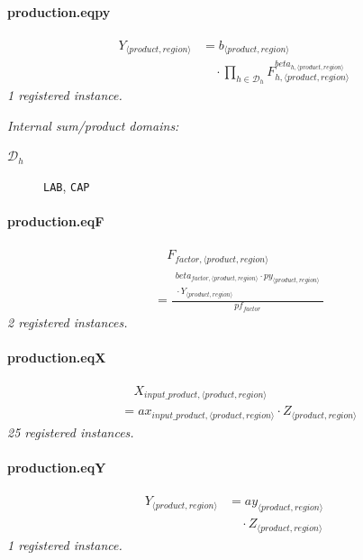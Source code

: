 \documentclass[11pt]{article}
\begin{document}
\paragraph{production.eqpy}
\begin{align*}
Y_{\langle product, region\rangle} &= b_{\langle product, region\rangle}\\
&\quad {}\cdot \prod_{h \in \mathcal{D}_{h}} F_{h,\langle product, region\rangle}^{beta_{h,\langle product, region\rangle}}
\end{align*}
\noindent\emph{1 registered instance.}\par
\noindent\emph{Internal sum/product domains:}\par
\begin{description}
\item[\(\mathcal{D}_{h}\)] \texttt{LAB}, \texttt{CAP}
\end{description}
\paragraph{production.eqF}
\begin{align*}
&\quad F_{factor,\langle product, region\rangle}\\
&= \frac{\begin{aligned}
beta_{factor,\langle product, region\rangle} \cdot py_{\langle product, region\rangle}\\
{}\cdot Y_{\langle product, region\rangle}
\end{aligned}}{pf_{factor}}
\end{align*}
\noindent\emph{2 registered instances.}\par
\paragraph{production.eqX}
\begin{align*}
&\quad X_{input\_product,\langle product, region\rangle}\\
&= ax_{input\_product,\langle product, region\rangle} \cdot Z_{\langle product, region\rangle}
\end{align*}
\noindent\emph{25 registered instances.}\par
\paragraph{production.eqY}
\begin{align*}
Y_{\langle product, region\rangle} &= ay_{\langle product, region\rangle}\\
&\quad {}\cdot Z_{\langle product, region\rangle}
\end{align*}
\noindent\emph{1 registered instance.}\par
\end{document}
